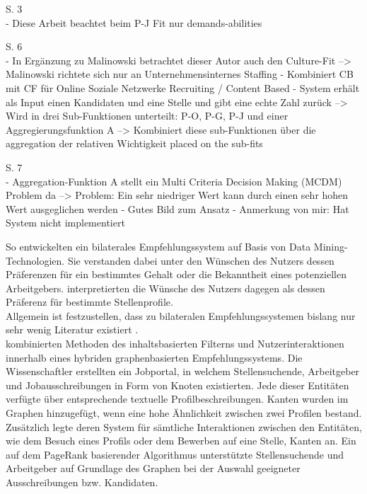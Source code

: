S. 3\\
- Diese Arbeit beachtet beim P-J Fit nur demands-abilities

S. 6\\
- In Ergänzung zu Malinowski betrachtet dieser Autor auch den Culture-Fit --> Malinowski richtete sich nur an Unternehmensinternes Staffing
- Kombiniert CB mit CF für Online Soziale Netzwerke Recruiting / Content Based
- System erhält als Input einen Kandidaten und eine Stelle und gibt eine echte Zahl zurück --> Wird in drei Sub-Funktionen unterteilt: P-O, P-G, P-J und einer Aggregierungsfunktion A --> Kombiniert diese sub-Funktionen über die aggregation der relativen Wichtigkeit placed on the sub-fits

S. 7\\
- Aggregation-Funktion A stellt ein Multi Criteria Decision Making (MCDM) Problem da --> Problem: Ein sehr niedriger Wert kann durch einen sehr hohen Wert ausgeglichen werden
- Gutes Bild zum Ansatz
- Anmerkung von mir: Hat System nicht implementiert



\newpage
So entwickelten \textcite[S. 1ff.]{applyingDataMining:2014} ein bilaterales Empfehlungssystem auf Basis von Data Mining-Technologien. Sie verstanden dabei unter den Wünschen des Nutzers dessen Präferenzen für ein bestimmtes Gehalt oder die Bekanntheit eines potenziellen Arbeitgebers. \textcite[S. 4ff.]{malinowski:2006} interpretierten die Wünsche des Nutzers dagegen als dessen Präferenz für bestimmte Stellenprofile.\\
Allgemein ist festzustellen, dass zu bilateralen Empfehlungssystemen bislang nur sehr wenig Literatur existiert \cite[S. 2f.]{jobRecommenderSystemsASurvey:2012}.\\

\textcite[S. 1ff.]{lu:2013} kombinierten Methoden des inhaltsbasierten Filterns und Nutzerinteraktionen innerhalb eines hybriden graphenbasierten Empfehlungssystems. Die Wissenschaftler erstellten ein Jobportal, in welchem Stellensuchende, Arbeitgeber und Jobausschreibungen in Form von Knoten existierten. Jede dieser Entitäten verfügte über entsprechende textuelle Profilbeschreibungen. Kanten wurden im Graphen hinzugefügt, wenn eine hohe Ähnlichkeit zwischen zwei Profilen bestand. Zusätzlich legte deren System für sämtliche Interaktionen zwischen den Entitäten, wie dem Besuch eines Profils oder dem Bewerben auf eine Stelle, Kanten an. Ein auf dem PageRank basierender Algorithmus unterstützte Stellensuchende und Arbeitgeber auf Grundlage des Graphen bei der Auswahl geeigneter Ausschreibungen bzw. Kandidaten.
